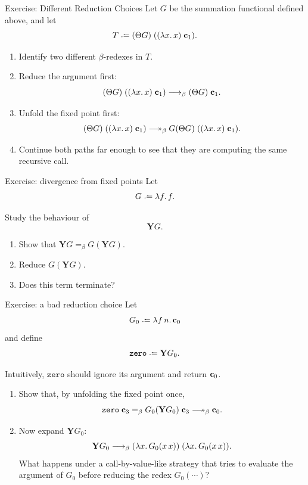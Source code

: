 \begin{frame}{Exercise: Different Reduction Choices}
  Let $G$ be the summation functional defined above, and let
  \[
    T \defeq (\Theta G)\;((\lambda x.\,x)\;\bc_1).
  \]

  \begin{enumerate}
    \item Identify two different $\beta$-redexes in $T$.

    \item Reduce the argument first:
      \[
        (\Theta G)\;((\lambda x.\,x)\;\mathbf{c}_1)
        \longrightarrow_{\beta}
        (\Theta G)\;\mathbf{c}_1.
      \]

    \item Unfold the fixed point first:
      \[
        (\Theta G)\;((\lambda x.\,x)\;\bc_1)
        \reduce
        G(\Theta G)\;((\lambda x.\,x)\;\bc_1).
      \]

    \item Continue both paths far enough to see that they are computing the
      same recursive call.
  \end{enumerate}
\end{frame}

\begin{frame}{Exercise: divergence from fixed points}
  Let
  \[
    G \defeq \lambda f.\,f.
  \]

  Study the behaviour of
  \[
    \mathbf{Y}G.
  \]

  \begin{enumerate}
    \item Show that $\mathbf{Y}G =_\beta G(\mathbf{Y}G)$.
    \item Reduce $G(\mathbf{Y}G)$.
    \item Does this term terminate?
  \end{enumerate}
\end{frame}
\begin{frame}{Exercise: a bad reduction choice}
  Let
  \[
    G_0 \defeq \lambda f\,n.\,\bc_0
  \]
  and define
  \[
    \mathtt{zero} \defeq \mathbf{Y}G_0.
  \]

  Intuitively, $\mathtt{zero}$ should ignore its argument and return $\mathbf{c}_0$.

  \begin{enumerate}
    \item Show that, by unfolding the fixed point once,
      \[
        \mathtt{zero}\;\bc_3
        =_\beta
        G_0(\mathbf{Y}G_0)\;\bc_3
        \reduce
        \bc_0.
      \]

    \item Now expand $\mathbf{Y}G_0$:
      \[
        \mathbf{Y}G_0
        \longrightarrow_{\beta}
        (\lambda x.\,G_0(x\,x))\;(\lambda x.\,G_0(x\,x)).
      \]
      What happens under a call-by-value-like strategy that tries to evaluate the
      argument of $G_0$ before reducing the redex $G_0(\cdots)$?
  \end{enumerate}
\end{frame}

